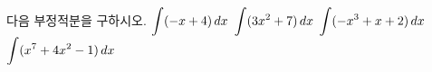 다음 부정적분을 구하시오.
 $\displaystyle\int (-x+4)\mkern3mu dx$
 $\displaystyle\int (3x^2+7)\mkern3mu dx$
 $\displaystyle\int (-x^3+x+2)\mkern3mu dx$
 $\displaystyle\int (x^7+4x^2-1)\mkern3mu dx$

